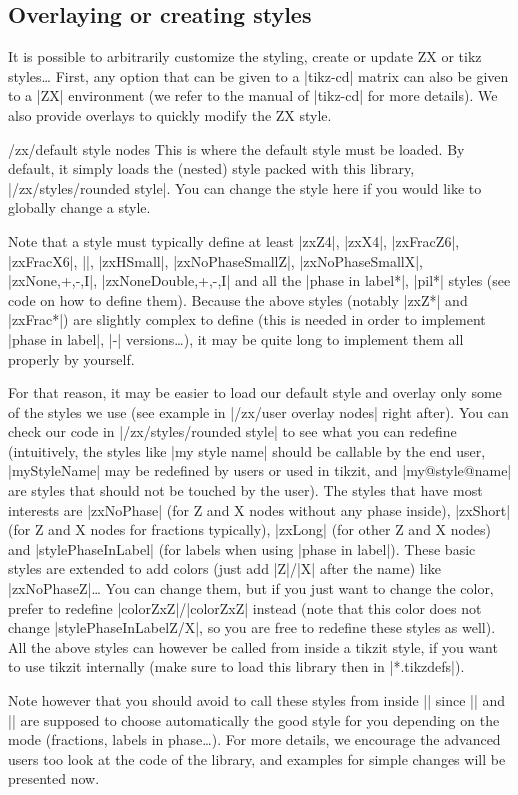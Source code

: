 \documentclass[a4paper,doc2]{ltxdoc} %
\begin{document}
\subsection{Overlaying or creating styles}

It is possible to arbitrarily customize the styling, create or update ZX or tikz styles\dots{} First, any option that can be given to a |tikz-cd| matrix can also be given to a |ZX| environment (we refer to the manual of |tikz-cd| for more details). We also provide overlays to quickly modify the ZX style.

\begin{stylekey}{/zx/default style nodes}
  This is where the default style must be loaded. By default, it simply loads the (nested) style packed with this library, |/zx/styles/rounded style|. You can change the style here if you would like to globally change a style.

  Note that a style must typically define at least |zxZ4|, |zxX4|, |zxFracZ6|, |zxFracX6|, |\zxH|, |zxHSmall|, |zxNoPhaseSmallZ|, |zxNoPhaseSmallX|, |zxNone{,+,-,I}|, |zxNoneDouble{,+,-,I}| and all the |phase in label*|, |pil*| styles (see code on how to define them). Because the above styles (notably |zxZ*| and |zxFrac*|) are slightly complex to define (this is needed in order to implement |phase in label|, |-| versions\dots{}), it may be quite long to implement them all properly by yourself.

  For that reason, it may be easier to load our default style and overlay only some of the styles we use (see example in |/zx/user overlay nodes| right after). You can check our code in |/zx/styles/rounded style| to see what you can redefine (intuitively, the styles like |my style name| should be callable by the end user, |myStyleName| may be redefined by users or used in tikzit, and |my@style@name| are styles that should not be touched by the user). The styles that have most interests are |zxNoPhase| (for Z and X nodes without any phase inside), |zxShort| (for Z and X nodes for fractions typically), |zxLong| (for other Z and X nodes) and |stylePhaseInLabel| (for labels when using |phase in label|). These basic styles are extended to add colors (just add |Z|/|X| after the name) like |zxNoPhaseZ|\dots{} You can change them, but if you just want to change the color, prefer to redefine |colorZxZ|/|colorZxZ| instead (note that this color does not change |stylePhaseInLabelZ/X|, so you are free to redefine these styles as well). All the above styles can however be called from inside a tikzit style, if you want to use tikzit internally (make sure to load this library then in |*.tikzdefs|).

  Note however that you should avoid to call these styles from inside || since |\zx*| and |\zxFrac*| are supposed to choose automatically the good style for you depending on the mode (fractions, labels in phase\dots{}). For more details, we encourage the advanced users too look at the code of the library, and examples for simple changes will be presented now.
\end{stylekey}
\end{document}
